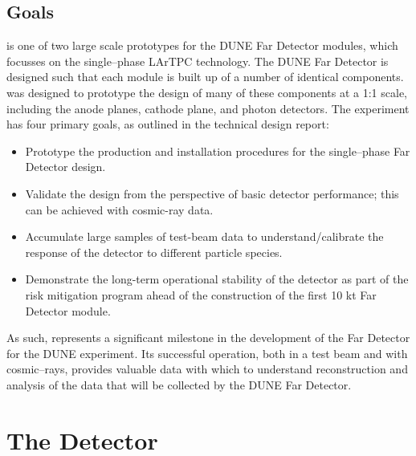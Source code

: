 \subsection{\protodune{} Goals}
\protodune{} is one of two large scale prototypes for the DUNE Far Detector
modules, which focusses on the single--phase LArTPC technology. The DUNE Far
Detector is designed such that each module is built up of a number of 
identical components. \protodune{} was designed to prototype the design of 
many of these components at a 1:1 scale, including the anode planes, cathode 
plane, and photon detectors. The \protodune{} experiment has four primary 
goals, as outlined in the technical design report\cite{Abi:2017aow}:
\begin{itemize}
	\item Prototype the production and installation procedures for the
		single--phase Far Detector design.
	\item Validate the design from the perspective of basic detector performance; this can be achieved with cosmic-ray data. 
	\item Accumulate large samples of test-beam data to understand/calibrate the
		response of the detector to different particle species.
	\item Demonstrate the long-term operational stability of the detector as part
		of the risk mitigation program ahead of the construction of the first 10 kt
		Far Detector module.
\end{itemize}
As such, \protodune{} represents a significant milestone in the development of
the Far Detector for the DUNE experiment. Its successful operation, both in a 
test beam and with cosmic--rays, provides valuable data with which to understand
reconstruction and analysis of the data that will be collected by the DUNE Far 
Detector.

\section{The \protodune{} Detector} \label{sec:pdsp_detector}

